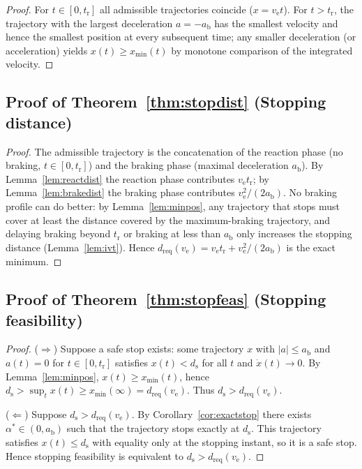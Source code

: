 \documentclass[conference, a4paper]{IEEEtran}
\theoremstyle{plain}
\newcommand{\dreq}{d_{\mathrm{req}}}
\newcommand{\ds}{d_{\mathrm{s}}}
\newcommand{\ab}{a_{\mathrm{b}}}
\newcommand{\tr}{t_{\mathrm{r}}}
\newcommand{\ve}{v_{\mathrm{e}}}
\begin{document}
\begin{proof}
For $t \in [0,\tr]$ all admissible trajectories coincide ($x = \ve t$). For
$t > \tr$, the trajectory with the largest deceleration $a = -\ab$ has the
smallest velocity and hence the smallest position at every subsequent time;
any smaller deceleration (or acceleration) yields $x(t) \geq x_{\min}(t)$ by
monotone comparison of the integrated velocity.
\end{proof}

\subsection{Proof of Theorem~\ref{thm:stopdist} (Stopping distance)}

\begin{proof}
The admissible trajectory is the concatenation of the reaction phase
(no braking, $t \in [0,\tr]$) and the braking phase (maximal deceleration
$\ab$). By Lemma~\ref{lem:reactdist} the reaction phase contributes
$\ve \tr$; by Lemma~\ref{lem:brakedist} the braking phase contributes
$\ve^2/(2\ab)$. No braking profile can do better: by
Lemma~\ref{lem:minpos}, any trajectory that stops must cover at least the
distance covered by the maximum-braking trajectory, and delaying braking
beyond $\tr$ or braking at less than $\ab$ only increases the stopping
distance (Lemma~\ref{lem:ivt}). Hence $\dreq(\ve) = \ve\tr + \ve^2/(2\ab)$
is the exact minimum.
\end{proof}

\subsection{Proof of Theorem~\ref{thm:stopfeas} (Stopping feasibility)}

\begin{proof}
($\Rightarrow$) Suppose a safe stop exists: some trajectory $x$ with
$|a| \leq \ab$ and $a(t) = 0$ for $t \in [0,\tr]$ satisfies
$x(t) < \ds$ for all $t$ and $\dot{x}(t) \to 0$. By
Lemma~\ref{lem:minpos}, $x(t) \geq x_{\min}(t)$, hence
$\ds > \sup_t x(t) \geq x_{\min}(\infty) = \dreq(\ve)$. Thus
$\ds > \dreq(\ve)$.

($\Leftarrow$) Suppose $\ds > \dreq(\ve)$. By
Corollary~\ref{cor:exactstop} there exists $\alpha^* \in (0,\ab)$ such that
the trajectory stops exactly at $\ds$. This trajectory satisfies
$x(t) \leq \ds$ with equality only at the stopping instant, so it is a safe
stop. Hence stopping feasibility is equivalent to $\ds > \dreq(\ve)$.
\end{proof}
\end{document}
